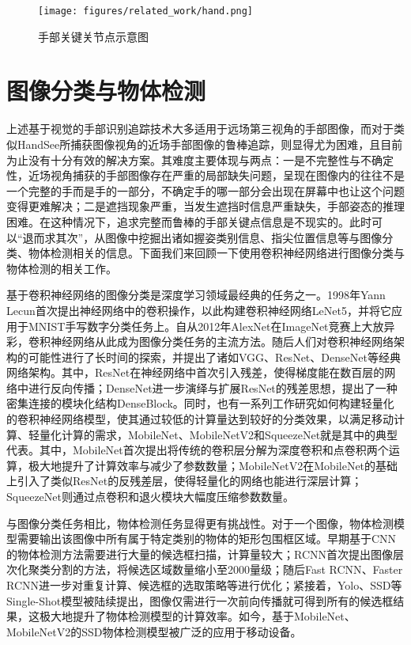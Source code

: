 \begin{figure}[h]
  \centering
  \texttt{[image: figures/related\_work/hand.png]}
  \caption{手部关键关节点示意图}
  \label{fig:hand_keypoints}
\end{figure}

\section{图像分类与物体检测}

上述基于视觉的手部识别追踪技术大多适用于远场第三视角的手部图像，而对于类似HandSee\cite{Yu:2019:HEF:3290605.3300935}所捕获图像视角的近场手部图像的鲁棒追踪，则显得尤为困难，且目前为止没有十分有效的解决方案。其难度主要体现与两点：一是不完整性与不确定性，近场视角捕获的手部图像存在严重的局部缺失问题，呈现在图像内的往往不是一个完整的手而是手的一部分，不确定手的哪一部分会出现在屏幕中也让这个问题变得更难解决；二是遮挡现象严重，当发生遮挡时信息严重缺失，手部姿态的推理困难。在这种情况下，追求完整而鲁棒的手部关键点信息是不现实的。此时可以“退而求其次”，从图像中挖掘出诸如握姿类别信息、指尖位置信息等与图像分类、物体检测相关的信息。下面我们来回顾一下使用卷积神经网络进行图像分类与物体检测的相关工作。

基于卷积神经网络的图像分类是深度学习领域最经典的任务之一。1998年Yann Lecun首次提出神经网络中的卷积操作，以此构建卷积神经网络LeNet5\cite{Lecun1998}，并将它应用于MNIST手写数字分类任务上。自从2012年AlexNet\cite{Krizhevsky:2012:ICD:2999134.2999257}在ImageNet竞赛上大放异彩，卷积神经网络从此成为图像分类任务的主流方法。随后人们对卷积神经网络架构的可能性进行了长时间的探索，并提出了诸如VGG\cite{2014arXiv1409.1556S}、ResNet\cite{2015arXiv151203385H}、DenseNet\cite{2016arXiv160806993H}等经典网络架构。其中，ResNet在神经网络中首次引入残差，使得梯度能在数百层的网络中进行反向传播\cite{2015arXiv151203385H}；DenseNet进一步演绎与扩展ResNet的残差思想\cite{2016arXiv160806993H}，提出了一种密集连接的模块化结构DenseBlock。同时，也有一系列工作研究如何构建轻量化的卷积神经网络模型，使其通过较低的计算量达到较好的分类效果，以满足移动计算、轻量化计算的需求，MobileNet\cite{2017arXiv170404861H}、MobileNetV2\cite{2018arXiv180104381S}和SqueezeNet\cite{2016arXiv160207360I}就是其中的典型代表。其中，MobileNet首次提出将传统的卷积层分解为深度卷积和点卷积两个运算，极大地提升了计算效率与减少了参数数量；MobileNetV2在MobileNet的基础上引入了类似ResNet的反残差层，使得轻量化的网络也能进行深层计算；SqueezeNet则通过点卷积和退火模块大幅度压缩参数数量。

与图像分类任务相比，物体检测任务显得更有挑战性。对于一个图像，物体检测模型需要输出该图像中所有属于特定类别的物体的矩形包围框区域。早期基于CNN的物体检测方法需要进行大量的候选框扫描，计算量较大；RCNN\cite{2013arXiv1311.2524G}首次提出图像层次化聚类分割的方法，将候选区域数量缩小至2000量级；随后Fast RCNN\cite{2015arXiv150408083G}、Faster RCNN\cite{2015arXiv150601497R}进一步对重复计算、候选框的选取策略等进行优化；紧接着，Yolo\cite{2015arXiv150602640R}、SSD\cite{2015arXiv151202325L}等Single-Shot模型被陆续提出，图像仅需进行一次前向传播就可得到所有的候选框结果，这极大地提升了物体检测模型的计算效率。如今，基于MobileNet\cite{2017arXiv170404861H}、MobileNetV2\cite{Sandler_2018}的SSD物体检测模型被广泛的应用于移动设备。